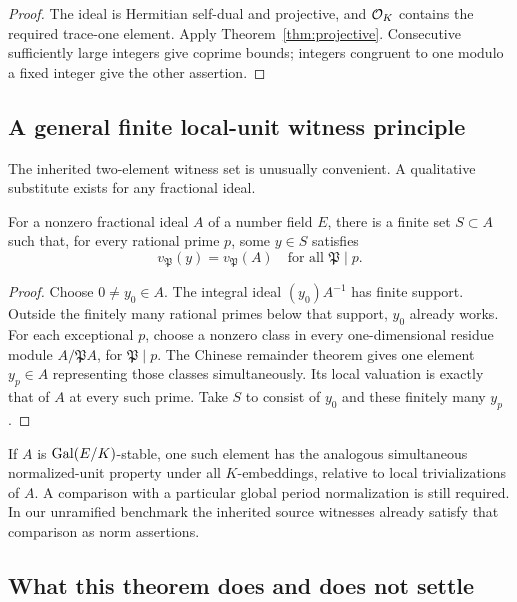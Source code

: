 \begin{proof}
The ideal is Hermitian self-dual and projective, and $\mathcal O_K$ contains the required trace-one element. Apply Theorem~\ref{thm:projective}. Consecutive sufficiently large integers give coprime bounds; integers congruent to one modulo a fixed integer give the other assertion.
\end{proof}

\subsection{A general finite local-unit witness principle}

The inherited two-element witness set is unusually convenient. A qualitative substitute exists for any fractional ideal.

\begin{lemma}\label{lem:local-generators}
For a nonzero fractional ideal $A$ of a number field $E$, there is a finite set $S\subset A$ such that, for every rational prime $p$, some $y\in S$ satisfies
\[
 v_{\mathfrak P}(y)=v_{\mathfrak P}(A)
 \quad\text{for all }\mathfrak P\mid p.
\]
\end{lemma}

\begin{proof}
Choose $0\ne y_0\in A$. The integral ideal $(y_0)A^{-1}$ has finite support. Outside the finitely many rational primes below that support, $y_0$ already works. For each exceptional $p$, choose a nonzero class in every one-dimensional residue module $A/\mathfrak P A$, for $\mathfrak P\mid p$. The Chinese remainder theorem gives one element $y_p\in A$ representing those classes simultaneously. Its local valuation is exactly that of $A$ at every such prime. Take $S$ to consist of $y_0$ and these finitely many $y_p$.
\end{proof}

If $A$ is $\operatorname{Gal}(E/K)$-stable, one such element has the analogous simultaneous normalized-unit property under all $K$-embeddings, relative to local trivializations of $A$. A comparison with a particular global period normalization is still required. In our unramified benchmark the inherited source witnesses already satisfy that comparison as norm assertions.

\subsection{What this theorem does and does not settle}

